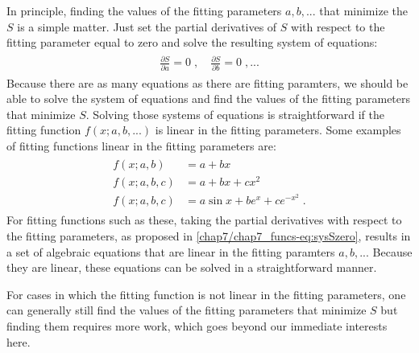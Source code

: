 \documentclass[letterpaper,10pt,english]{sphinxmanual}
\begin{document}
In principle, finding the values of the fitting parameters $a, b, ...$ that minimize the $S$ is a simple matter.  Just set the partial derivatives of $S$ with respect to the fitting parameter equal to zero and solve the resulting system of equations:
\label{chap7/chap7_funcs:equation-eq:sysSzero}\begin{gather}
\begin{split}\frac{\partial S}{\partial a} = 0 \;, \quad
\frac{\partial S}{\partial b} = 0 \;, ...\end{split}\label{chap7/chap7_funcs-eq:sysSzero}
\end{gather}
Because there are as many equations as there are fitting paramters, we should be able to solve the system of equations and find the values of the fitting parameters that minimize $S$.  Solving those systems of equations is straightforward if the fitting function $f(x; a, b, ...)$ is linear in the fitting parameters.  Some examples of fitting functions linear in the fitting parameters are:
\label{chap7/chap7_funcs:equation-eq:fitfuncs}\begin{gather}
\begin{split}f(x; a, b) &= a + bx \\
f(x; a, b, c) &= a + bx + cx^2 \\
f(x; a, b, c) &= a \sin x + b e^x + c e^{-x^2} \;.\end{split}\label{chap7/chap7_funcs-eq:fitfuncs}
\end{gather}
For fitting functions such as these, taking the partial derivatives with respect to the fitting parameters, as proposed in \eqref{chap7/chap7_funcs-eq:sysSzero}, results in a set of algebraic equations that are linear in the fitting paramters $a, b, ...$ Because they are linear, these equations can be solved in a straightforward manner.

For cases in which the fitting function is not linear in the fitting parameters, one can generally still find the values of the fitting parameters that minimize $S$ but finding them requires more work, which goes beyond our immediate interests here.
\end{document}
